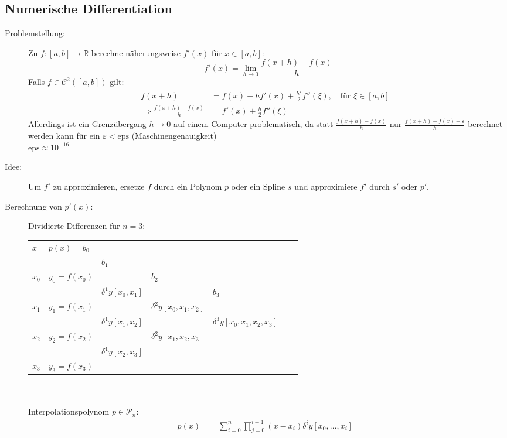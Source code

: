 \documentclass[12pt]{article}
\theoremstyle{break}
\begin{document}
\subsection{Numerische Differentiation}
\begin{description}
  \item[Problemstellung:] Zu $f: [a,b] \rightarrow \mathbb{R}$ berechne näherungsweise $f'(x)$ für $x \in [a,b]$:
  $$f'(x) = \lim_{h \rightarrow 0} \frac{f(x+h) - f(x)}{h}$$
  Falls $f \in \mathcal{C}^2([a,b])$ gilt:
  \begin{align*}
  f(x+h) &= f(x) + hf'(x) + \frac{h^2}{2} f''(\xi), \quad \text{für } \xi \in [a,b] &\\
  \Rightarrow \frac{f(x+h) - f(x)}{h} &= f'(x) + \frac{h}{2} f''(\xi)
  \end{align*}
  Allerdings ist ein Grenzübergang $h \rightarrow 0$ auf einem Computer problematisch, da statt $\frac{f(x+h) - f(x)}{h}$ nur $\frac{f(x+h) - f(x) + \varepsilon}{h}$ berechnet werden kann für ein $\varepsilon < \text{eps}$ (Maschinengenauigkeit) \\
  $\text{eps} \approx 10^{-16}$
  \item[Idee:] Um $f'$ zu approximieren, ersetze $f$ durch ein Polynom $p$ oder ein Spline $s$ und approximiere $f'$ durch $s'$ oder $p'$.
  \item[Berechnung von $p'(x)$:]  Dividierte Differenzen für $n=3$:\\
  \begin{tabular}{lllllll}
    $x$ & $p(x) = b_0$ \\
    &&$b_1$\\
	$x_0$ & $y_0 = f(x_0)$ && $b_2$\\
	 & & $\delta^1y[x_0, x_1]$&& $b_3$\\
	$x_1$ & $y_1 = f(x_1)$ & &$\delta^2y[x_0, x_1, x_2]$ & \rotatebox[origin=c]{90}{$=$}\\
	 & & $\delta^1y[x_1, x_2]$ & & $\delta^3y[x_0, x_1, x_2, x_3]$\\
	$x_2$ & $y_2 = f(x_2)$ & & $\delta^2y[x_1, x_2, x_3]$\\
	 & & $\delta^1y[x_2, x_3]$\\
	$x_3$ & $y_3 = f(x_3)$ \\
  \end{tabular}\\\\
  Interpolationspolynom $p \in \mathcal{P}_n$:
  \begin{align*}
    p(x) &= \sum_{i=0}^n \prod_{j=0}^{i-1} (x-x_i) \delta^iy[x_0,..., x_i] &\\

\end{align*}
\end{description}
\end{document}
